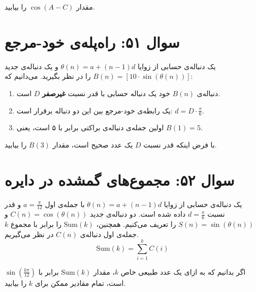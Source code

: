 \documentclass[12pt]{article}
\begin{document}
	مقدار \( \cos(A-C) \) را بیابید.
	
	\vspace{1cm}
	\hrulefill
	\vspace{1cm}
	
	\section*{سوال ۵۱: راه‌پله‌ی خود-مرجع }
	یک دنباله‌ی حسابی از زوایا \( \theta(n) = a + (n-1)d \) و یک دنباله‌ی جدید \( B(n) = [10 \cdot \sin(\theta(n))] \) را در نظر بگیرید. می‌دانیم که:
	\begin{enumerate}[label=(\roman*)]
		\item دنباله‌ی \(B(n)\) خود یک دنباله حسابی با قدر نسبت \textbf{غیرصفر} \(D\) است.
		\item یک رابطه‌ی خود-مرجع بین این دو دنباله برقرار است: \( d = D \cdot \frac{\pi}{6} \).
		\item اولین جمله‌ی دنباله‌ی براکتی برابر با ۵ است، یعنی \(B(1) = 5\).
	\end{enumerate}
	\vspace{0.5cm}
	با فرض اینکه قدر نسبت \(D\) یک عدد صحیح است، مقدار \(B(3)\) را بیابید.
	
	\vspace{1cm}
	\hrulefill
	\vspace{1cm}
	
	\section*{سوال ۵۲: مجموع‌های گمشده در دایره}
	یک دنباله‌ی حسابی از زوایا \( \theta(n) = a + (n-1)d \) با جمله‌ی اول \(a = \frac{\pi}{12}\) و قدر نسبت \(d = \frac{\pi}{6}\) داده شده است.
	دو دنباله‌ی جدید \( C(n) = \cos(\theta(n)) \) و \( S(n) = \sin(\theta(n)) \) را تعریف می‌کنیم.
	همچنین، \( \text{Sum}(k) \) را برابر با مجموع \(k\) جمله‌ی اول دنباله‌ی \(C(n)\) در نظر می‌گیریم.
	\begin{displaymath}
		\text{Sum}(k) = \sum_{i=1}^{k} C(i)
	\end{displaymath}
	\vspace{0.5cm}
	
	اگر بدانیم که به ازای یک عدد طبیعی خاص \(k\)، مقدار \( \text{Sum}(k) \) برابر با \( \sin(\frac{k\pi}{12}) \) است، تمام مقادیر ممکن برای \(k\) را بیابید.
	
\end{document}
